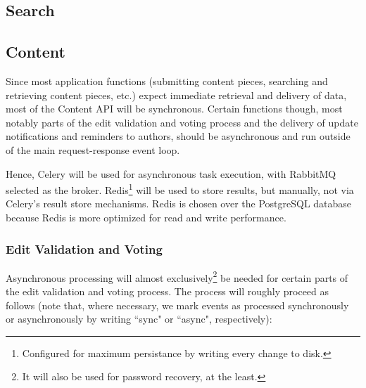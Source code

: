 \documentclass[12pt,letterpaper]{article}
\begin{document}
\subsection{Search}








\subsection{Content}

Since most application functions (submitting content pieces, searching and retrieving content pieces, etc.) expect immediate retrieval and delivery of data, most of the Content API will be synchronous. Certain functions though, most notably parts of the edit validation and voting process and the delivery of update notifications and reminders to authors, should be asynchronous and run outside of the main request-response event loop. 

Hence, Celery will be used for asynchronous task execution, with RabbitMQ selected as the broker. Redis\footnote{Configured for maximum persistance by writing every change to disk.} will be used to store results, but manually, not via Celery's result store mechanisms. Redis is chosen over the PostgreSQL database because Redis is more optimized for read and write performance.


\subsubsection{Edit Validation and Voting}

Asynchronous processing will almost exclusively\footnote{It will also be used for password recovery, at the least.} be needed for certain parts of the edit validation and voting process. The process will roughly proceed as follows (note that, where necessary, we mark events as processed synchronously or asynchronously by writing ``sync" or ``async", respectively):
\end{document}

